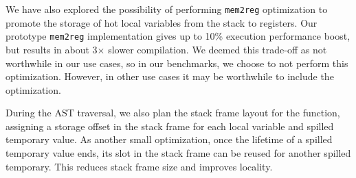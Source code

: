 \documentclass[acmsmall,nonacm,screen]{acmart}\settopmatter{printfolios=true,printccs=true,printacmref=false}
\newcommand{\todo}[1]{{\color{red}(#1)}}
\newcommand{\X}{$\times$}
\begin{document}
We have also explored the possibility of performing {\tt mem2reg} optimization to promote the storage of hot local variables from the stack to registers. Our prototype {\tt mem2reg} implementation gives up to 10\% execution performance boost, but results in about \num{3}\X{} slower compilation. We deemed this trade-off as not worthwhile in our use cases, so in our benchmarks, we choose to not perform this optimization. However, in other use cases it may be worthwhile to include the optimization.

During the AST traversal, we also plan the stack frame layout for the function, assigning a storage offset in the stack frame for each local variable and spilled temporary value. As another small optimization, once the lifetime of a spilled temporary value ends, its slot in the stack frame can be reused for another spilled temporary. This reduces stack frame size and improves locality.

\end{document}
